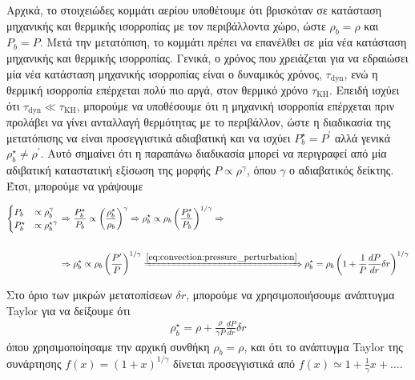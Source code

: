 Αρχικά, το στοιχειώδες κομμάτι αερίου υποθέτουμε ότι βρισκόταν σε κατάσταση μηχανικής και θερμικής ισορροπίας με τον περιβάλλοντα χώρο, ώστε $\rho_b = \rho$ και $P_b = P$. Μετά την μετατόπιση, το κομμάτι πρέπει να επανέλθει σε μία νέα κατάσταση μηχανικής και θερμικής ισορροπίας. Γενικά, ο χρόνος που χρειάζεται για να εδραιώσει μία νέα κατάσταση μηχανικής ισορροπίας είναι ο δυναμικός χρόνος, $\tau_{\text{dyn}}$, ενώ η θερμική ισορροπία επέρχεται πολύ πιο αργά, στον θερμικό χρόνο $\tau_{\text{KH}}$. Επειδή ισχύει ότι $\tau_{\text{dyn}} \ll \tau_{\text{KH}}$, μπορούμε να υποθέσουμε ότι η μηχανική ισορροπία επέρχεται πριν προλάβει να γίνει ανταλλαγή θερμότητας με το περιβάλλον, ώστε η διαδικασία της μετατόπισης να είναι προσεγγιστικά αδιαβατική και να ισχύει $P_b^{\star} = P^{\prime}$ αλλά γενικά $\rho_b^{\star} \neq \rho^{\prime}$. Αυτό σημαίνει ότι η παραπάνω διαδικασία μπορεί να περιγραφεί από μία αδιβατική καταστατική εξίσωση της μορφής $P \propto \rho^{\gamma}$, όπου $\gamma$ ο αδιαβατικός δείκτης. Έτσι, μπορούμε να γράψουμε

\begin{align*}
    \begin{cases}
        P_b &\propto \rho_b^{\gamma} \\
        P_b^{\star} &\propto {\rho_b^{\star}}^{\gamma}
    \end{cases} &\Rightarrow
    \frac{ P_b^{\star}}{P_b} \propto \left(\frac{\rho_b^{\star}}{\rho_b}\right)^{\gamma} \Rightarrow \rho_b^{\star} \propto \rho_b \left(\frac{P_b^{\star}}{P_b} \right)^{1/\gamma} \Rightarrow \\\\
    &\Rightarrow \rho_b^{\star} \propto \rho_b \left(\frac{P^{\prime}}{P} \right)^{1/\gamma} \xRightarrow{\eqref{eq:convection:pressure_perturbation}}{\rho_b^{\star} = \rho_b \left(1 + \frac{1}{P} \frac{dP}{dr}\delta r \right)^{1/\gamma}}
\end{align*}

Στο όριο των μικρών μετατοπίσεων $\delta r$, μπορούμε να χρησιμοποιήσουμε ανάπτυγμα Taylor για να δείξουμε ότι
\begin{eqnarray}
    \label{eq:convection:new_blob_density_expression}
    \rho_b^{\star} = \rho + \frac{\rho}{\gamma P} \frac{dP}{dr} \delta r
\end{eqnarray}
όπου χρησιμοποίησαμε την αρχική συνθήκη $\rho_b = \rho$, και ότι το ανάπτυγμα Taylor της συνάρτησης $f(x) = (1+x)^{1/\gamma}$ δίνεται προσεγγιστικά από $f(x) \simeq 1 + \frac{1}{\gamma}x + \dots$.

